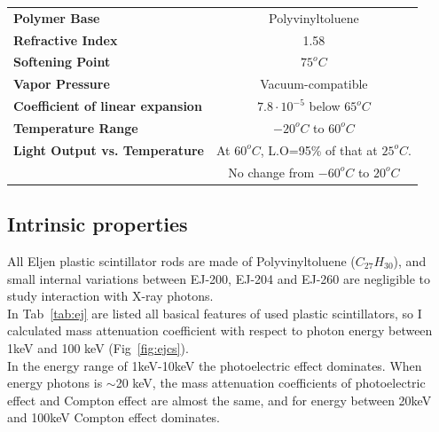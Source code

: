 \documentclass[10pt,a4paper, openany]{book}
\begin{document}
\begin{table}[!h]
\begin{tabular}{lccc}
\textbf{Polymer Base}                                  & \multicolumn{3}{c}{Polyvinyltoluene}                         \\
\textbf{Refractive Index}                              & \multicolumn{3}{c}{1.58}                                     \\
\textbf{Softening Point}                               & \multicolumn{3}{c}{$75^o C$}                                 \\
\textbf{Vapor Pressure}                                & \multicolumn{3}{c}{Vacuum-compatible}                        \\
\textbf{Coefficient of linear expansion}               & \multicolumn{3}{c}{$7.8 \cdot 10^{-5}$ below $65^oC$}        \\
\textbf{Temperature Range}                             & \multicolumn{3}{c}{$-20^oC$ to $60^oC$}                      \\
\textbf{Light Output vs. Temperature}                  & \multicolumn{3}{c}{At $60^oC$, L.O=95\% of that at $25^oC$.} \\
\textbf{}                                              & \multicolumn{3}{c}{No change from $-60^oC$ to $20^oC$} \\ 
\bottomrule    
\end{tabular}
\end{table}

\subsection{Intrinsic properties }

All Eljen plastic scintillator rods are made of Polyvinyltoluene ($C_{27}H_{30}$), and small internal variations between EJ-200, EJ-204 and EJ-260 are negligible to study interaction with X-ray photons.\\
In Tab~\ref{tab:ej} are listed all basical features of used plastic scintillators, so I calculated mass attenuation coefficient with respect to photon energy between 1keV and 100 keV (Fig~\ref{fig:ejcs}).\\
In the energy range of 1keV-10keV the photoelectric effect dominates. When energy photons is $\sim$20 keV, the mass attenuation coefficients of photoelectric effect and Compton effect are almost the same, and for energy between 20keV and 100keV Compton effect dominates.
\end{document}
